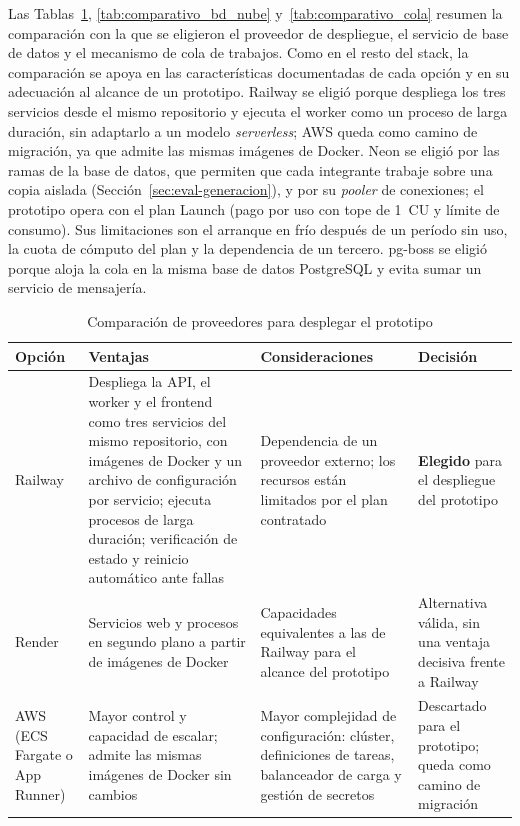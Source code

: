 Las Tablas~\ref{tab:comparativo_hosting}, \ref{tab:comparativo_bd_nube} y~\ref{tab:comparativo_cola} resumen la comparación con la que se eligieron el proveedor de despliegue, el servicio de base de datos y el mecanismo de cola de trabajos. Como en el resto del stack, la comparación se apoya en las características documentadas de cada opción y en su adecuación al alcance de un prototipo. Railway se eligió porque despliega los tres servicios desde el mismo repositorio y ejecuta el worker como un proceso de larga duración, sin adaptarlo a un modelo \emph{serverless}; AWS queda como camino de migración, ya que admite las mismas imágenes de Docker. Neon se eligió por las ramas de la base de datos, que permiten que cada integrante trabaje sobre una copia aislada (Sección~\ref{sec:eval-generacion}), y por su \emph{pooler} de conexiones; el prototipo opera con el plan Launch (pago por uso con tope de 1~CU y límite de consumo). Sus limitaciones son el arranque en frío después de un período sin uso, la cuota de cómputo del plan y la dependencia de un tercero. pg-boss se eligió porque aloja la cola en la misma base de datos PostgreSQL y evita sumar un servicio de mensajería.

\begin{table}[h]
\centering
\caption{Comparación de proveedores para desplegar el prototipo}
\label{tab:comparativo_hosting}
\renewcommand{\arraystretch}{1.3}
\begin{tabular}{|m{2.3cm}|m{4.4cm}|m{4.4cm}|m{3.4cm}|}
\hline
\textbf{Opción} & \textbf{Ventajas} & \textbf{Consideraciones} & \textbf{Decisión} \\
\hline
Railway & Despliega la API, el worker y el frontend como tres servicios del mismo repositorio, con imágenes de Docker y un archivo de configuración por servicio; ejecuta procesos de larga duración; verificación de estado y reinicio automático ante fallas & Dependencia de un proveedor externo; los recursos están limitados por el plan contratado & \textbf{Elegido} para el despliegue del prototipo \\
\hline
Render & Servicios web y procesos en segundo plano a partir de imágenes de Docker & Capacidades equivalentes a las de Railway para el alcance del prototipo & Alternativa válida, sin una ventaja decisiva frente a Railway \\
\hline
AWS (ECS Fargate o App Runner) & Mayor control y capacidad de escalar; admite las mismas imágenes de Docker sin cambios & Mayor complejidad de configuración: clúster, definiciones de tareas, balanceador de carga y gestión de secretos & Descartado para el prototipo; queda como camino de migración \\
\hline
\end{tabular}
\end{table}


